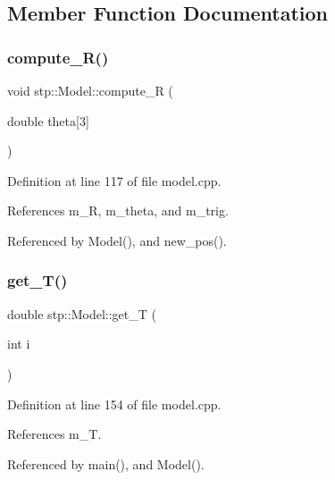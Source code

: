 \subsection{Member Function Documentation}
\mbox{\label{classstp_1_1_model_afeda6e56bb177dc53c2c3fd1a86a2388}} 
\subsubsection{\texorpdfstring{compute\+\_\+\+R()}{compute\_R()}}
{\footnotesize\ttfamily void stp\+::\+Model\+::compute\+\_\+R (\begin{DoxyParamCaption}\item[{double}]{theta\mbox{[}3\mbox{]} }\end{DoxyParamCaption})}



Definition at line 117 of file model.\+cpp.



References m\+\_\+R, m\+\_\+theta, and m\+\_\+trig.



Referenced by Model(), and new\+\_\+pos().

\mbox{\label{classstp_1_1_model_a96807e2f67ea212b44e89bc567d8fa2a}} 
\subsubsection{\texorpdfstring{get\+\_\+\+T()}{get\_T()}}
{\footnotesize\ttfamily double stp\+::\+Model\+::get\+\_\+T (\begin{DoxyParamCaption}\item[{int}]{i }\end{DoxyParamCaption})}



Definition at line 154 of file model.\+cpp.



References m\+\_\+T.



Referenced by main(), and Model().

\mbox{\label{classstp_1_1_model_a7856980516ed1f0613420a402b5b8d8c}} 

